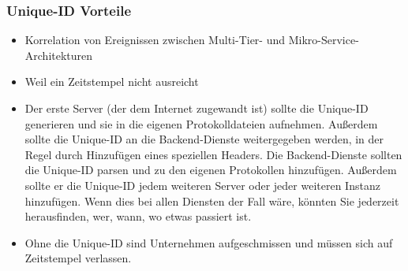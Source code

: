 \subsubsection{Unique-ID Vorteile}
\begin{itemize}
    \item Korrelation von Ereignissen zwischen Multi-Tier- und Mikro-Service-Architekturen
    \item Weil ein Zeitstempel nicht ausreicht
    \item Der erste Server (der dem Internet zugewandt ist) sollte die Unique-ID generieren und sie in die eigenen Protokolldateien aufnehmen. Außerdem sollte die Unique-ID an die Backend-Dienste weitergegeben werden, in der Regel durch Hinzufügen eines speziellen Headers. Die Backend-Dienste sollten die Unique-ID parsen und zu den eigenen Protokollen hinzufügen. Außerdem sollte er die Unique-ID jedem weiteren Server oder jeder weiteren Instanz hinzufügen. Wenn dies bei allen Diensten der Fall wäre, könnten Sie jederzeit herausfinden, wer, wann, wo etwas passiert ist.
    \item Ohne die Unique-ID sind Unternehmen aufgeschmissen und müssen sich auf Zeitstempel verlassen.
\end{itemize}

